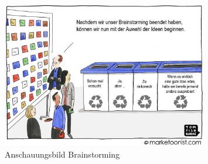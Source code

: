 \begin{figure}[h!]
	\centering
	\includegraphics[width=0.8\textwidth]{graphics/Brain}
	\caption{Anschauungsbild Brainstorming}
	\label{fig:Brainstorming}
\end{figure} 




  

